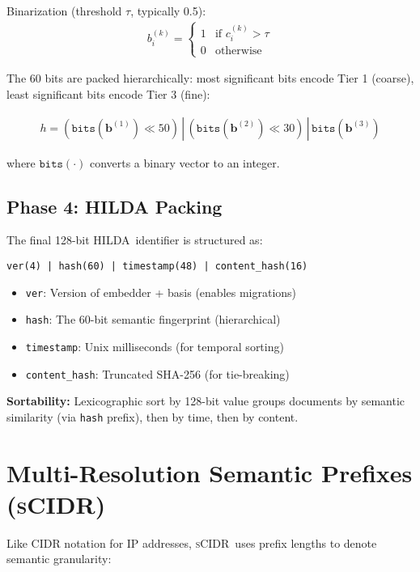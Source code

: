 \documentclass[11pt]{article}
\newcommand{\hilda}{\textsc{HILDA}}
\newcommand{\scidr}{\textsc{sCIDR}}
\begin{document}
Binarization (threshold $\tau$, typically 0.5):
\begin{align}
b_i^{(k)} = \begin{cases}
1 & \text{if } c_i^{(k)} > \tau \\
0 & \text{otherwise}
\end{cases}
\end{align}

The 60 bits are packed hierarchically: most significant bits encode Tier 1 (coarse), least significant bits encode Tier 3 (fine):

\begin{align}
h = (\texttt{bits}(\mathbf{b}^{(1)}) \ll 50) \,|\, (\texttt{bits}(\mathbf{b}^{(2)}) \ll 30) \,|\, \texttt{bits}(\mathbf{b}^{(3)})
\end{align}

where $\texttt{bits}(\cdot)$ converts a binary vector to an integer.

\subsection{Phase 4: HILDA Packing}

The final 128-bit \hilda\ identifier is structured as:

\begin{center}
\texttt{ver(4) | hash(60) | timestamp(48) | content\_hash(16)}
\end{center}

\begin{itemize}
  \item \texttt{ver}: Version of embedder + basis (enables migrations)
  \item \texttt{hash}: The 60-bit semantic fingerprint (hierarchical)
  \item \texttt{timestamp}: Unix milliseconds (for temporal sorting)
  \item \texttt{content\_hash}: Truncated SHA-256 (for tie-breaking)
\end{itemize}

\textbf{Sortability:} Lexicographic sort by 128-bit value groups documents by semantic similarity (via \texttt{hash} prefix), then by time, then by content.

\section{Multi-Resolution Semantic Prefixes (\scidr)}

Like CIDR notation for IP addresses, \scidr\ uses prefix lengths to denote semantic granularity:
\end{document}
